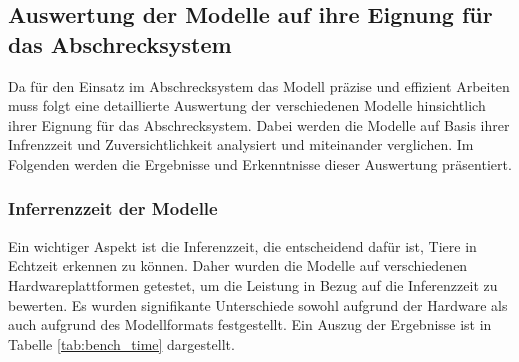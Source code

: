 \subsection{Auswertung der Modelle auf ihre Eignung für das Abschrecksystem} \label{cap:Benchmarks}

Da für den Einsatz im Abschrecksystem das Modell präzise und effizient Arbeiten muss folgt eine detaillierte Auswertung der verschiedenen Modelle hinsichtlich ihrer Eignung für das Abschrecksystem. Dabei werden die Modelle auf Basis ihrer Infrenzzeit und Zuversichtlichkeit analysiert und miteinander verglichen. Im Folgenden werden die Ergebnisse und Erkenntnisse dieser Auswertung präsentiert.

\subsubsection{Inferrenzzeit der Modelle}

Ein wichtiger Aspekt ist die Inferenzzeit, die entscheidend dafür ist, Tiere in Echtzeit erkennen zu können. Daher wurden die Modelle auf verschiedenen Hardwareplattformen getestet, um die Leistung in Bezug auf die Inferenzzeit zu bewerten. Es wurden signifikante Unterschiede sowohl aufgrund der Hardware als auch aufgrund des Modellformats festgestellt. Ein Auszug der Ergebnisse ist in Tabelle \ref{tab:bench_time} dargestellt.

